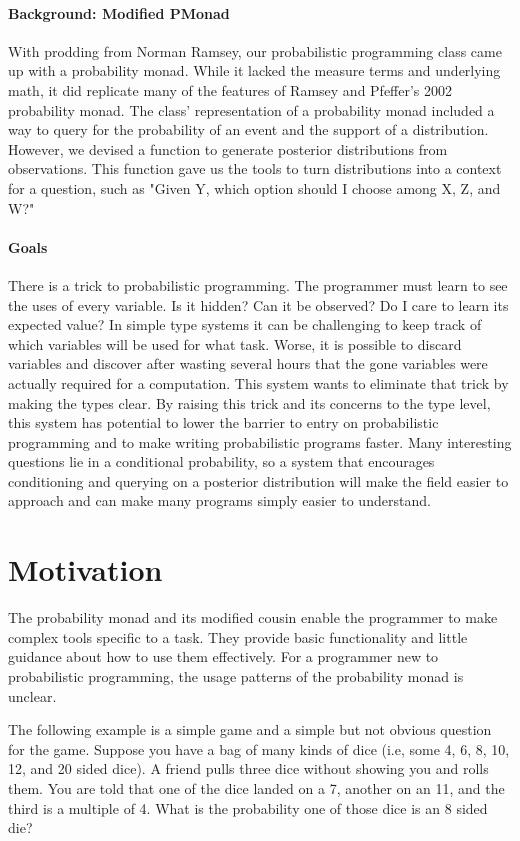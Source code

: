\documentclass[9pt,twocolumn]{article}
\begin{document}
\paragraph{Background: Modified PMonad}
With prodding from Norman Ramsey, our probabilistic programming class came up with a probability monad. While it lacked the measure terms and underlying math, it did replicate many of the features of Ramsey and Pfeffer's 2002 probability monad. The class' representation of a probability monad included a way to query for the probability of an event and the support of a distribution. However, we devised a function to generate posterior distributions from observations. This function gave us the tools to turn distributions into a context for a question, such as "Given Y, which option should I choose among X, Z, and W?"

\paragraph{Goals}
There is a trick to probabilistic programming. The programmer must learn to see the uses of every variable. Is it hidden? Can it be observed? Do I care to learn its expected value? In simple type systems it can be challenging to keep track of which variables will be used for what task. Worse, it is possible to discard variables and discover after wasting several hours that the gone variables were actually required for a computation. This system wants to eliminate that trick by making the types clear. By raising this trick and its concerns to the type level, this system has potential to lower the barrier to entry on probabilistic programming and to make writing probabilistic programs faster. Many interesting questions lie in a conditional probability, so a system that encourages conditioning and querying on a posterior distribution will make the field easier to approach and can make many programs simply easier to understand.

\section{Motivation}
The probability monad and its modified cousin enable the programmer to make complex tools specific to a task. They provide basic functionality and little guidance about how to use them effectively. For a programmer new to probabilistic programming, the usage patterns of the probability monad is unclear.

The following example is a simple game and a simple but not obvious question for the game. Suppose you have a bag of many kinds of dice (i.e, some 4, 6, 8, 10, 12, and 20 sided dice). A friend pulls three dice without showing you and rolls them. You are told that one of the dice landed on a 7, another on an 11, and the third is a multiple of 4. What is the probability one of those dice is an 8 sided die?
\end{document}
